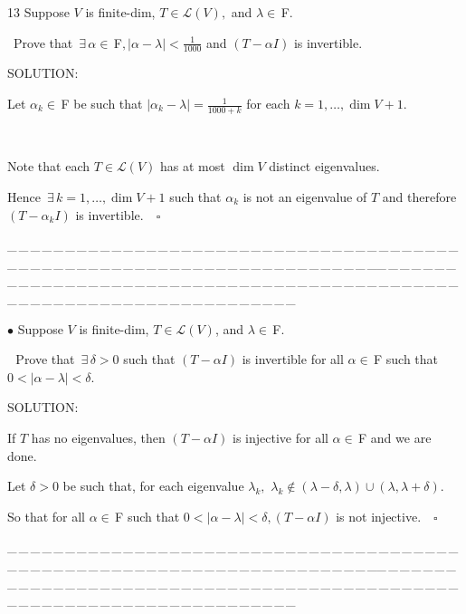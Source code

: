 \documentclass[a4paper, 11pt, UTF8]{article}
\def\Lm{\mathcal{L}}
\def\Fbf{$\,{\timesbf F}\,$}
\def\Fbfc{$\,{\timesbf F}$}
\begin{document}
\begin{large}
{\timesbf\Large 13} {\timessl\Large 
Suppose $V$ is finite-dim, $T\in\Lm(V),$ and $\lambda\in\Fbfc.$}\par\quad\,
{\timessl\Large Prove that $\,\exists\,\alpha\in\Fbfc,|\alpha-\lambda|<\frac{1}{1000}$ and $(T-\alpha I)$ is invertible.}\par
{\timesbf S\footnotesize{OLUTION:}}\par\quad
Let $\alpha_k\in\Fbf\,$be such that $|\alpha_k-\lambda|=\displaystyle\frac{1}{1000+k}$ for each $k=1,\dots,\dim V+1.$\par{\tiny\,\par}\quad
Note that each $T\in\Lm(V)$ has at most $\dim V$ distinct eigenvalues.\par\quad
Hence $\,\exists\,k=1,\dots,\dim V+1$ such that $\alpha_k$ is not an eigenvalue of $T$ and therefore $(T-\alpha_k I)$ is invertible.$\quad\square$\par
{\tiny \_\,\_\,\_\,\_\,\_\,\_\,\_\,\_\,\_\,\_\,\_\,\_\,\_\,\_\,\_\,\_\,\_\,\_\,\_\,\_\,\_\,\_\,\_\,\_\,\_\,\_\,\_\,\_\,\_\,\_\,\_\,\_\,\_\,\_\,\_\,\_\,\_\,\_\,\_\,\_\,\_\,\_\,\_\,\_\,\_\,\_\,\_\,\_\,\_\,\_\,\_\,\_\,\_\,\_\,\_\,\_\,\_\,\_\,\_\,\_\,\_\,\_\,\_\,\_\,\_\,\_\,\_\,\_\,\_\,\_\,\_\_\,\_\,\_\,\_\,\_\,\_\,\_\,\_\,\_\,\_\,\_\,\_\,\_\,\_\,\_\,\_\,\_\,\_\,\_\,\_\,\_\,\_\,\_\,\_\,\_\,\_\,\_\,\_\,\_\,\_\,\_\,\_\,\_\,\_\,\_\,\_\,\_\,\_\,\_\,\_\,\_\,\_\,\_\,\_\,\_\,\_\,\_\,\_\,\_\,\_\,\_\,\_\,\_\,\_\,\_\,\_\,\_\,\_\,\_\,\_\,\_\,\_\,\_\,\_\,\_\,\_\,\_\,\_\,\_\,\_\,\_}\par

{\small $\bullet$} {\timessl\Large 
Suppose $V$ is finite-dim, $T\in\Lm(V)$, and $\lambda\in\Fbfc.$}\par\,\,
{\timessl\Large Prove that $\,\exists\,\delta > 0$ such that $(T-\alpha I)$ is invertible for all $\alpha\in\Fbf\,$such that $0 < |\alpha-\lambda| < \delta$.
}\par
{\timesbf S\footnotesize{OLUTION:}}\par\quad
If $T$ has no eigenvalues, then $(T-\alpha I)$ is injective for all $\alpha\in\Fbf\,$and we are done.\par\quad
Let $\delta>0$ be such that, for each eigenvalue $\lambda_k,$ $\lambda_k\not\in(\lambda-\delta,\lambda)\cup (\lambda,\lambda+\delta).$\par\quad
So that for all $\alpha\in\Fbf\,$such that $0<|\alpha-\lambda|<\delta,(T-\alpha I)$ is not injective.$\quad\square$\par
{\tiny \_\,\_\,\_\,\_\,\_\,\_\,\_\,\_\,\_\,\_\,\_\,\_\,\_\,\_\,\_\,\_\,\_\,\_\,\_\,\_\,\_\,\_\,\_\,\_\,\_\,\_\,\_\,\_\,\_\,\_\,\_\,\_\,\_\,\_\,\_\,\_\,\_\,\_\,\_\,\_\,\_\,\_\,\_\,\_\,\_\,\_\,\_\,\_\,\_\,\_\,\_\,\_\,\_\,\_\,\_\,\_\,\_\,\_\,\_\,\_\,\_\,\_\,\_\,\_\,\_\,\_\,\_\,\_\,\_\,\_\,\_\_\,\_\,\_\,\_\,\_\,\_\,\_\,\_\,\_\,\_\,\_\,\_\,\_\,\_\,\_\,\_\,\_\,\_\,\_\,\_\,\_\,\_\,\_\,\_\,\_\,\_\,\_\,\_\,\_\,\_\,\_\,\_\,\_\,\_\,\_\,\_\,\_\,\_\,\_\,\_\,\_\,\_\,\_\,\_\,\_\,\_\,\_\,\_\,\_\,\_\,\_\,\_\,\_\,\_\,\_\,\_\,\_\,\_\,\_\,\_\,\_\,\_\,\_\,\_\,\_\,\_\,\_\,\_\,\_\,\_\,\_}\par


\end{large}
\end{document}
